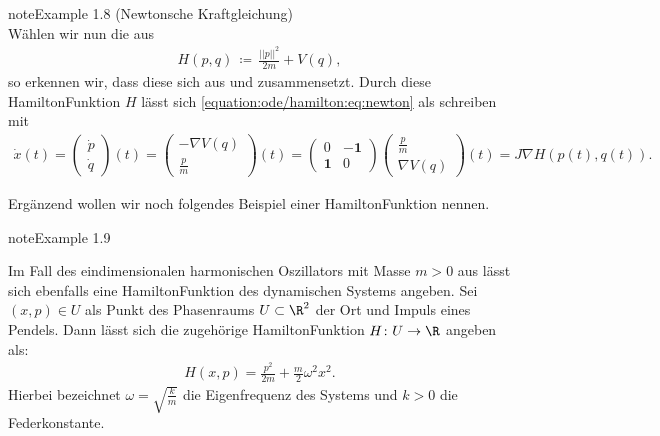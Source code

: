 \documentclass[letterpaper,10pt,german]{jupyterBook}
\begin{document}
\begin{sphinxadmonition}{note}{Example 1.8 (Newtonsche Kraftgleichung)}
\begin{equation}
\end{equation}
\sphinxAtStartPar
Wählen wir nun die  aus {\hyperref[\detokenize{ode/hamilton:def:hamiltonsch}]{}}
\begin{equation*}
\begin{split}H(p,q) \, \coloneqq \, \frac{||p||^2}{2m} + V(q),\end{split}
\end{equation*}
\sphinxAtStartPar
so erkennen wir, dass diese sich aus  und  zusammensetzt.
Durch diese Hamilton\sphinxhyphen{}Funktion \(H\) lässt sich \eqref{equation:ode/hamilton:eq:newton} als  schreiben mit
\begin{equation*}
\begin{split}\dot{x}(t) = \begin{pmatrix}\dot{p} \\ \dot{q} \end{pmatrix}(t) = \begin{pmatrix} -\nabla V(q) \\ \frac{p}{m} \end{pmatrix}(t) = \begin{pmatrix}0 & -\mathbf{1}\\ \mathbf{1} & 0 \end{pmatrix} \begin{pmatrix} \frac{p}{m} \\ \nabla V(q) \end{pmatrix}(t) = J \nabla H(p(t),q(t)).\end{split}
\end{equation*}\end{sphinxadmonition}

\sphinxAtStartPar
Ergänzend wollen wir noch folgendes Beispiel einer Hamilton\sphinxhyphen{}Funktion nennen.
\label{ode/hamilton:example-4}
\begin{sphinxadmonition}{note}{Example 1.9}



\sphinxAtStartPar
Im Fall des eindimensionalen harmonischen Oszillators mit Masse \(m > 0\) aus {\hyperref[\detokenize{ode/fluesse:ex:oscillations}]{}} lässt sich ebenfalls eine Hamilton\sphinxhyphen{}Funktion des dynamischen Systems angeben.
Sei \((x,p) \in U\) als Punkt des Phasenraums \(U \subset \R^2\) der Ort und Impuls eines Pendels.
Dann lässt sich die zugehörige Hamilton\sphinxhyphen{}Funktion \(H \colon U \rightarrow \R\) angeben als:
\begin{equation*}
\begin{split}H(x,p) = \frac{p^2}{2m} + \frac{m}{2} \omega^2 x^2.\end{split}
\end{equation*}
\sphinxAtStartPar
Hierbei bezeichnet \(\omega = \sqrt{\frac{k}{m}}\) die Eigenfrequenz des Systems und \(k > 0\) die Federkonstante.
\end{sphinxadmonition}
\end{document}
